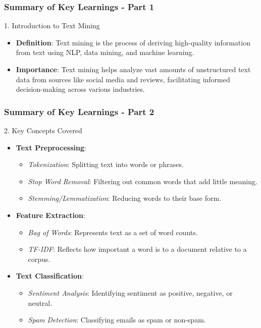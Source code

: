 \documentclass[aspectratio=169]{beamer}
\begin{document}
\begin{frame}[fragile]
    \frametitle{Summary of Key Learnings - Part 1}
    \begin{block}{1. Introduction to Text Mining}
        \begin{itemize}
            \item \textbf{Definition}: Text mining is the process of deriving high-quality information from text using NLP, data mining, and machine learning.
            \item \textbf{Importance}: Text mining helps analyze vast amounts of unstructured text data from sources like social media and reviews, facilitating informed decision-making across various industries.
        \end{itemize}
    \end{block}
\end{frame}

\begin{frame}[fragile]
    \frametitle{Summary of Key Learnings - Part 2}
    \begin{block}{2. Key Concepts Covered}
        \begin{itemize}
            \item \textbf{Text Preprocessing}:
                \begin{itemize}
                    \item \textit{Tokenization}: Splitting text into words or phrases.
                    \item \textit{Stop Word Removal}: Filtering out common words that add little meaning.
                    \item \textit{Stemming/Lemmatization}: Reducing words to their base form.
                \end{itemize}
            \item \textbf{Feature Extraction}:
                \begin{itemize}
                    \item \textit{Bag of Words}: Represents text as a set of word counts.
                    \item \textit{TF-IDF}: Reflects how important a word is to a document relative to a corpus.
                \end{itemize}
            \item \textbf{Text Classification}:
                \begin{itemize}
                    \item \textit{Sentiment Analysis}: Identifying sentiment as positive, negative, or neutral.
                    \item \textit{Spam Detection}: Classifying emails as spam or non-spam.
                \end{itemize}
        \end{itemize}
    \end{block}
\end{frame}
\end{document}

